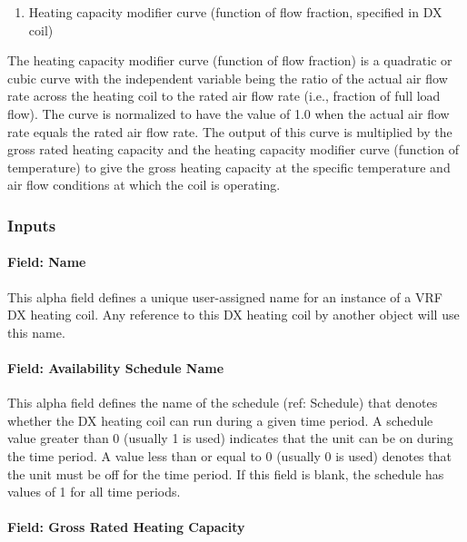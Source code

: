 \begin{enumerate}
\def\labelenumi{\arabic{enumi})}
\setcounter{enumi}{1}
\tightlist
\item
  Heating capacity modifier curve (function of flow fraction, specified in DX coil)
\end{enumerate}

The heating capacity modifier curve (function of flow fraction) is a quadratic or cubic curve with the independent variable being the ratio of the actual air flow rate across the heating coil to the rated air flow rate (i.e., fraction of full load flow). The curve is normalized to have the value of 1.0 when the actual air flow rate equals the rated air flow rate. The output of this curve is multiplied by the gross rated heating capacity and the heating capacity modifier curve (function of temperature) to give the gross heating capacity at the specific temperature and air flow conditions at which the coil is operating.

\subsubsection{Inputs}\label{inputs-7-010}

\paragraph{Field: Name}\label{field-name-6-007}

This alpha field defines a unique user-assigned name for an instance of a VRF DX heating coil. Any reference to this DX heating coil by another object will use this name.

\paragraph{Field: Availability Schedule Name}\label{field-availability-schedule-name-2-004}

This alpha field defines the name of the schedule (ref: Schedule) that denotes whether the DX heating coil can run during a given time period. A schedule value greater than 0 (usually 1 is used) indicates that the unit can be on during the time period. A value less than or equal to 0 (usually 0 is used) denotes that the unit must be off for the time period. If this field is blank, the schedule has values of 1 for all time periods.

\paragraph{Field: Gross Rated Heating Capacity}\label{field-gross-rated-heating-capacity-1}

